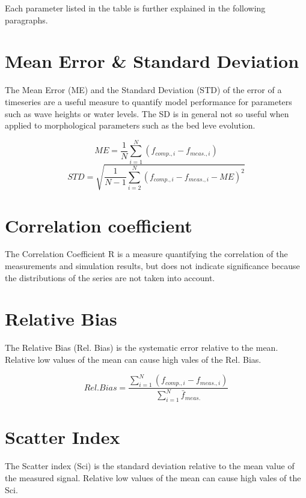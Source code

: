 Each parameter listed in the table is further explained in the following paragraphs.

\section{Mean Error \& Standard Deviation}

The Mean Error (ME) and the Standard Deviation (STD) of the error of a timeseries are a useful measure to quantify model performance for parameters such as wave heights or water levels. The SD is in general not so useful when applied to morphological parameters such as the bed leve evolution.

\begin{equation}ME=\frac{1}{N}\sum_{i=1}^N(f_{comp.,i}-f_{meas.,i})\end{equation}
\begin{equation}STD=\sqrt{\frac{1}{N-1}\sum_{i=2}^N(f_{comp.,i}-f_{meas.,i}-ME)^{2}}\end{equation}

\section{Correlation coefficient}

The Correlation Coefficient R is a measure quantifying the correlation of the measurements and simulation results, but does not indicate significance because the distributions of the series are not taken into account.

\section{Relative Bias}

The Relative Bias (Rel. Bias) is the systematic error relative to the mean. Relative low values of the mean can cause high vales of the Rel. Bias.

\begin{equation}Rel. Bias=\frac{\sum_{i=1}^N(f_{comp.,i}-f_{meas.,i})}{\sum_{i=1}^N\bar f_{meas.}}\end{equation}

\section{Scatter Index}

The Scatter index (Sci) is the standard deviation relative to the mean value of the measured signal. Relative low values of the mean can cause high vales of the Sci. 

